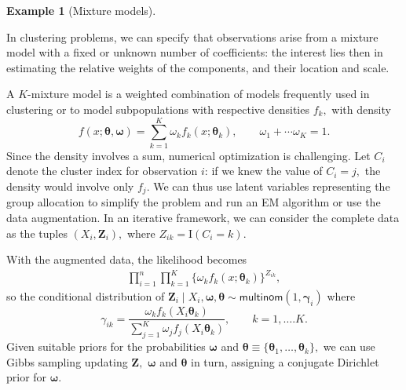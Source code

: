 \documentclass[
  11pt,
  letterpaper,
]{scrbook}
\theoremstyle{definition}
\newtheorem{example}{Example}[chapter]
\theoremstyle{plain}
\theoremstyle{plain}
\theoremstyle{plain}
\theoremstyle{definition}
\theoremstyle{definition}
\theoremstyle{plain}
\theoremstyle{plain}
\theoremstyle{remark}
\begin{document}
\begin{example}[Mixture
models]\protect\hypertarget{exm-mixture}{}\label{exm-mixture}

In clustering problems, we can specify that observations arise from a
mixture model with a fixed or unknown number of coefficients: the
interest lies then in estimating the relative weights of the components,
and their location and scale.

A \(K\)-mixture model is a weighted combination of models frequently
used in clustering or to model subpopulations with respective densities
\(f_k,\) with density
\[f(x; \boldsymbol{\theta}, \boldsymbol{\omega}) = \sum_{k=1}^K \omega_kf_k(x; \boldsymbol{\theta}_k), \qquad \omega_1 + \cdots \omega_K=1.\]
Since the density involves a sum, numerical optimization is challenging.
Let \(C_i\) denote the cluster index for observation \(i\): if we knew
the value of \(C_i =j,\) the density would involve only \(f_j.\) We can
thus use latent variables representing the group allocation to simplify
the problem and run an EM algorithm or use the data augmentation. In an
iterative framework, we can consider the complete data as the tuples
\((X_i, \boldsymbol{Z}_i),\) where \(Z_{ik} = \mathrm{I}(C_i=k).\)

With the augmented data, the likelihood becomes \begin{align*}
\prod_{i=1}^n \prod_{k=1}^K \{\omega_kf_k(x; \boldsymbol{\theta}_k)\}^{Z_{ik}},
\end{align*} so the conditional distribution of
\(\boldsymbol{Z}_i \mid X_i, \boldsymbol{\omega}, \boldsymbol{\theta} \sim \mathsf{multinom}(1, \boldsymbol{\gamma}_{i})\)
where
\[\gamma_{ik} = \frac{\omega_k f_k(X_i\boldsymbol{\theta}_k)}{\sum_{j=1}^K \omega_jf_j(X_i\boldsymbol{\theta}_k)}, \qquad k=1, \ldots. K.\]
Given suitable priors for the probabilities \(\boldsymbol{\omega}\) and
\(\boldsymbol{\theta} \equiv \{\boldsymbol{\theta}_1, \ldots, \boldsymbol{\theta}_k\},\)
we can use Gibbs sampling updating \(\boldsymbol{Z},\)
\(\boldsymbol{\omega}\) and \(\boldsymbol{\theta}\) in turn, assigning a
conjugate Dirichlet prior for \(\boldsymbol{\omega}.\)

\end{example}
\end{document}
